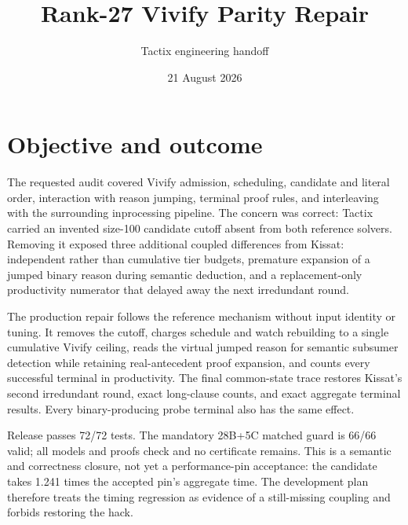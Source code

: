 \documentclass[11pt]{article}
\title{Rank-27 Vivify Parity Repair}
\author{Tactix engineering handoff}
\date{21 August 2026}
\begin{document}
\maketitle

\section*{Objective and outcome}
The requested audit covered Vivify admission, scheduling, candidate and
literal order, interaction with reason jumping, terminal proof rules, and
interleaving with the surrounding inprocessing pipeline.  The concern was
correct: Tactix carried an invented size-100 candidate cutoff absent from both
reference solvers.  Removing it exposed three additional coupled differences
from Kissat: independent rather than cumulative tier budgets, premature
expansion of a jumped binary reason during semantic deduction, and a
replacement-only productivity numerator that delayed away the next
irredundant round.

The production repair follows the reference mechanism without input identity
or tuning.  It removes the cutoff, charges schedule and watch rebuilding to a
single cumulative Vivify ceiling, reads the virtual jumped reason for semantic
subsumer detection while retaining real-antecedent proof expansion, and
counts every successful terminal in productivity.  The final common-state
trace restores Kissat's second irredundant round, exact long-clause counts, and
exact aggregate terminal results.  Every binary-producing probe terminal also
has the same effect.

Release passes 72/72 tests.  The mandatory 28B+5C matched guard is 66/66 valid;
all models and proofs check and no certificate remains.  This is a semantic
and correctness closure, not yet a performance-pin acceptance: the candidate
takes 1.241 times the accepted pin's aggregate time.  The development plan
therefore treats the timing regression as evidence of a still-missing coupling
and forbids restoring the hack.
\end{document}
